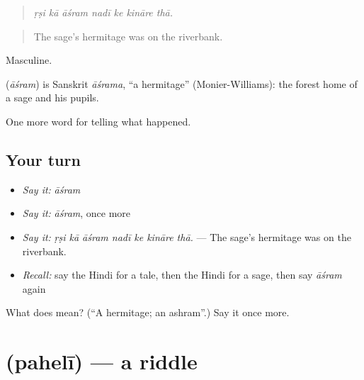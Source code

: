 \begin{quote}
      
\end{quote}

\begin{quote}
\emph{ṛṣi kā āśram nadī ke kināre thā.}
\end{quote}

\begin{quote}
The sage's hermitage was on the riverbank.
\end{quote}

Masculine.

\begin{cousinweb}
\textbf{} (\emph{āśram}) is Sanskrit \emph{āśrama}, \textquotedblleft{}a hermitage\textquotedblright{} (Monier-Williams): the forest home of a sage and his pupils.
\end{cousinweb}

\begin{grammarlens}[title={What you've built}]
One more word for telling what happened.
\end{grammarlens}

\subsection*{Your turn}
\begin{itemize}
\raggedright
  \item \emph{Say it:} \emph{āśram}
  \item \emph{Say it:} \emph{āśram}, once more
  \item \emph{Say it:} \emph{ṛṣi kā āśram nadī ke kināre thā.} — The sage's hermitage was on the riverbank.
  \item \emph{Recall:} say the Hindi for a tale, then the Hindi for a sage, then say \emph{āśram} again
\end{itemize}

\begin{tcolorbox}[breakable,colback=teal!4,colframe=teal!35!black,title={Before you move on}]
What does  mean? (\textquotedblleft{}A hermitage; an ashram\textquotedblright{}.) Say it once more.
\end{tcolorbox}
\section[\texorpdfstring{\hi{पहेली} (pahelī)}{पहेली (pahelī)}]{ (pahelī) — a riddle}

\label{lesson:HI-C334-paheli}



